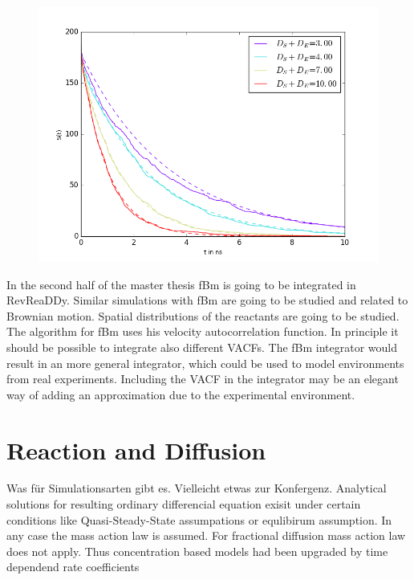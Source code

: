 \documentclass[
  a4paper,BCOR10mm,oneside,
  bibtotoc,idxtotoc,
  headsepline,footsepline,%
  fleqn,openbib
]{scrbook}
\begin{document}
\begin{figure}[h!]
  \centering
  \includegraphics[width=\linewidth]{./data/besta.png}
  \captionsetup{width=0.9\linewidth}
  \label{fig:reactionssimulation}
\end{figure}
\newline \noindent In the second half of the master thesis fBm is going to be integrated in RevReaDDy. Similar simulations with fBm are going to be studied and related to Brownian motion. Spatial distributions of the reactants are going to be studied. The algorithm for fBm uses his velocity autocorrelation function. In principle it should be possible to integrate also different VACFs. The fBm integrator would result in an more general integrator, which could be used to model environments from real experiments. Including the VACF in the integrator may be an elegant way of adding an approximation due to the experimental environment. 


\chapter{Reaction and Diffusion}
Was für Simulationsarten gibt es.
Vielleicht etwas zur Konfergenz.
Analytical solutions for resulting ordinary differencial equation exisit under certain conditions like Quasi-Steady-State assumpations or equlibirum assumption. In any case the mass action law is assumed. For fractional diffusion mass action law does not apply. Thus concentration based models had been upgraded by time dependend rate coefficients \cite{Berry2002}  \cite{schnell2004reaction}
\end{document}
